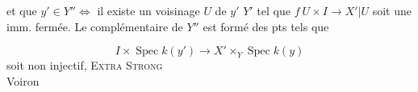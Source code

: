 et que $y'\in Y''\iff$ il existe un voisinage $U$ de $y'$  $Y'$ tel que $f\ U\times I\to X'|U$ soit une  imm. fermée. Le complémentaire de $Y''$ est formé des pts tels que

\[
I\times\operatorname{Spec}k(y')\longrightarrow X'\times_Y\operatorname{Spec}k(y)
\]
soit  non injectif,
\textsc{Extra Strong}\\
 Voiron
